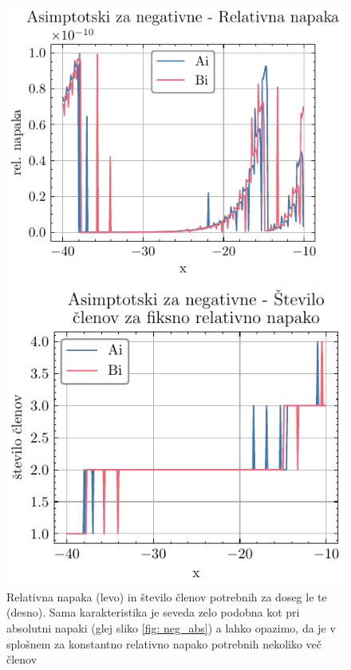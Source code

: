 \documentclass[slovene,11pt,a4paper]{article}
\begin{document}
\begin{figure}[H]
  \centering
  \begin{minipage}{0.48\textwidth}
    \centering
    \includegraphics[width=\linewidth]{graphs/neg_rel_err.pdf}
  \end{minipage}\hfill
  \begin{minipage}{0.48\textwidth}
    \centering
    \includegraphics[width=\linewidth]{graphs/neg_rel_err_n.pdf}
  \end{minipage}
  \caption{Relativna napaka (levo) in število členov potrebnih za doseg le te (desno). Sama karakteristika je seveda zelo podobna kot pri absolutni napaki (glej sliko \ref{fig: neg_abs}) a lahko opazimo, da je v splošnem za konstantno relativno napako potrebnih nekoliko več členov}
  \label{fig: neg_rel}
\end{figure}
\end{document}
